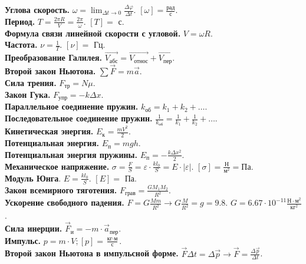 \documentclass[12pt]{article}
\begin{document}
	\textbf{Углова скорость.} $\omega = \lim_{\varDelta t \rightarrow 0} \frac{\varDelta \varphi}{\varDelta t}$. $[\omega] = \frac{\text{рад}}{\text{с}}$. \\
	\textbf{Период.} $T = \frac{2 \pi R}{V} = \frac{2 \pi}{\omega}$. $[T] =$ с. \\
	\textbf{Формула связи линейной скорости с угловой.} $V = \omega R$. \\
	\textbf{Частота.} $\nu = \frac{1}{T}$. $[\nu] =$ Гц. \\
	\textbf{Преобразование Галилея.} $\vec{V_{\text{абс}}} = \vec{V_{\text{относ}}} + \vec{V_{\text{пер}}}$. \\
	\textbf{Второй закон Ньютона.} $\sum\vec{F} = m\vec{a}$. \\
	\textbf{Сила трения.} $F_{\text{тр}} = N \mu$. \\
	\textbf{Закон Гука.} $F_{\text{упр}} = -k \varDelta x$. \\
	\textbf{Параллельное соединение пружин.} $k_{\text{об}} = k_1 + k_2 + \dots$. \\
	\textbf{Последовательное соединение пружин.} $\frac{1}{k_{\text{об}}} = \frac{1}{k_1} + \frac{1}{k_2} + \dots$. \\
	\textbf{Кинетическая энергия.} $E_{\text{к}} = \frac{mV^2}{2}$. \\
	\textbf{Потенциальная энергия.} $E_{\text{п}} = mgh$. \\
	\textbf{Потенциальная энергия пружины.} $E_{\text{п}} = -\frac{k \varDelta x^2}{2}$. \\
	\textbf{Механическое напряжение.} $\sigma = \frac{F}{S} = \varepsilon \cdot \frac{kl_0}{S} = E \cdot |\varepsilon|$. $[\sigma] = \frac{\text{Н}}{\text{м}^2} = \text{Па}$. \\
	\textbf{Модуль Юнга}. $E = \frac{kl_0}{S}$. $[E] =$ Па. \\
	\textbf{Закон всемирного тяготения.} $F_{\text{грав}} = \frac{GM_1M_2}{R^2}$. \\
	\textbf{Ускорение свободного падения.} $F = G \frac{Mm}{R^2} \rightarrow G \frac{M}{R^2} = g = 9.8$. $G = 6.67 \cdot 10^{-11} \frac{\text{Н} \cdot \text{м}^2}{\text{кг}^2}$. \\
	\textbf{Сила инерции.} $\vec{F}_{\text{и}} = -m \cdot \vec{a}_{\text{пер}}$. \\
	\textbf{Импульс.} $p = m \cdot V; [p] = \frac{\text{кг} \cdot \text{м}}{\text{с}}$. \\
	\textbf{Второй закон Ньютона в импульсной форме.} $\vec{F} \varDelta t = \varDelta \vec{p} \rightarrow \vec{F} = \frac{\varDelta \vec{p}}{\varDelta t}$. \\
\end{document}
